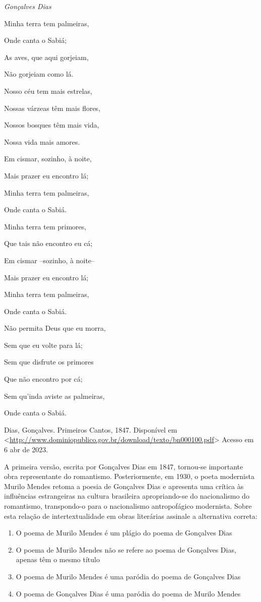 {\emph{Gonçalves Dias}

Minha terra tem palmeiras,

Onde canta o Sabiá;

As aves, que aqui gorjeiam,

Não gorjeiam como lá.

Nosso céu tem mais estrelas,

Nossas várzeas têm mais flores,

Nossos bosques têm mais vida,

Nossa vida mais amores.

Em cismar, sozinho, à noite,

Mais prazer eu encontro lá;

Minha terra tem palmeiras,

Onde canta o Sabiá.

Minha terra tem primores,

Que tais não encontro eu cá;

Em cismar --sozinho, à noite--

Mais prazer eu encontro lá;

Minha terra tem palmeiras,

Onde canta o Sabiá.

Não permita Deus que eu morra,

Sem que eu volte para lá;

Sem que disfrute os primores

Que não encontro por cá;

Sem qu'inda aviste as palmeiras,

Onde canta o Sabiá.

Dias, Gonçalves. Primeiros Cantos, 1847. Disponível em
\textless{}\href{http://www.dominiopublico.gov.br/download/texto/bn000100.pdf}{\uline{http://www.dominiopublico.gov.br/download/texto/bn000100.pdf}}\textgreater{}
Acesso em 6 abr de 2023.

A primeira versão, escrita por Gonçalves Dias em 1847, tornou-se
importante obra representante do romantismo. Posteriormente, em 1930, o
poeta modernista Murilo Mendes retoma a poesia de Gonçalves Dias e
apresenta uma crítica às influências estrangeiras na cultura brasileira
apropriando-se do nacionalismo do romantismo, transpondo-o para o
nacionalismo antropofágico modernista. Sobre esta relação de
intertextualidade em obras literárias assinale a alternativa correta:

\begin{enumerate}
\def\labelenumi{\alph{enumi})}
\item
  O poema de Murilo Mendes é um plágio do poema de Gonçalves Dias
\item
  O poema de Murilo Mendes não se refere ao poema de Gonçalves Dias,
  apenas têm o mesmo título
\item
  O poema de Murilo Mendes é uma paródia do poema de Gonçalves Dias
\item
  O poema de Gonçalves Dias é uma paródia do poema de Murilo Mendes
\end{enumerate}

}
